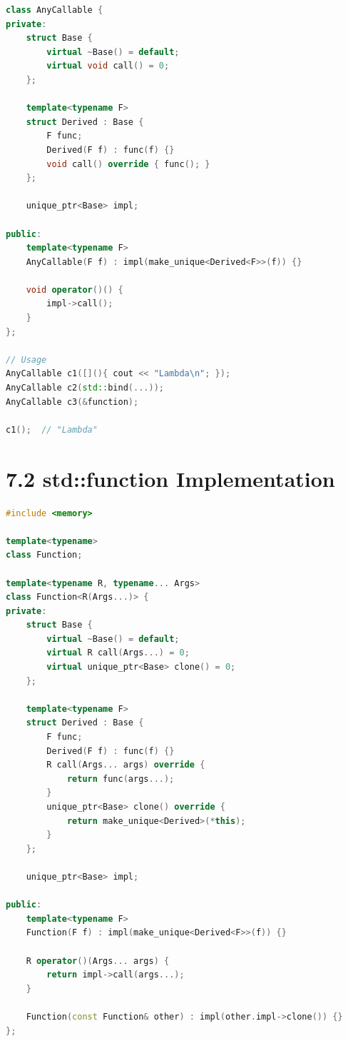 \begin{lstlisting}[language={C++}]
class AnyCallable {
private:
    struct Base {
        virtual ~Base() = default;
        virtual void call() = 0;
    };
    
    template<typename F>
    struct Derived : Base {
        F func;
        Derived(F f) : func(f) {}
        void call() override { func(); }
    };
    
    unique_ptr<Base> impl;
    
public:
    template<typename F>
    AnyCallable(F f) : impl(make_unique<Derived<F>>(f)) {}
    
    void operator()() {
        impl->call();
    }
};

// Usage
AnyCallable c1([](){ cout << "Lambda\n"; });
AnyCallable c2(std::bind(...));
AnyCallable c3(&function);

c1();  // "Lambda"
\end{lstlisting}

\hypertarget{stdfunction-implementation}{%
\section{7.2 std::function
Implementation}\label{stdfunction-implementation}}

\begin{lstlisting}[language={C++}]
#include <memory>

template<typename>
class Function;

template<typename R, typename... Args>
class Function<R(Args...)> {
private:
    struct Base {
        virtual ~Base() = default;
        virtual R call(Args...) = 0;
        virtual unique_ptr<Base> clone() = 0;
    };
    
    template<typename F>
    struct Derived : Base {
        F func;
        Derived(F f) : func(f) {}
        R call(Args... args) override {
            return func(args...);
        }
        unique_ptr<Base> clone() override {
            return make_unique<Derived>(*this);
        }
    };
    
    unique_ptr<Base> impl;
    
public:
    template<typename F>
    Function(F f) : impl(make_unique<Derived<F>>(f)) {}
    
    R operator()(Args... args) {
        return impl->call(args...);
    }
    
    Function(const Function& other) : impl(other.impl->clone()) {}
};
\end{lstlisting}

